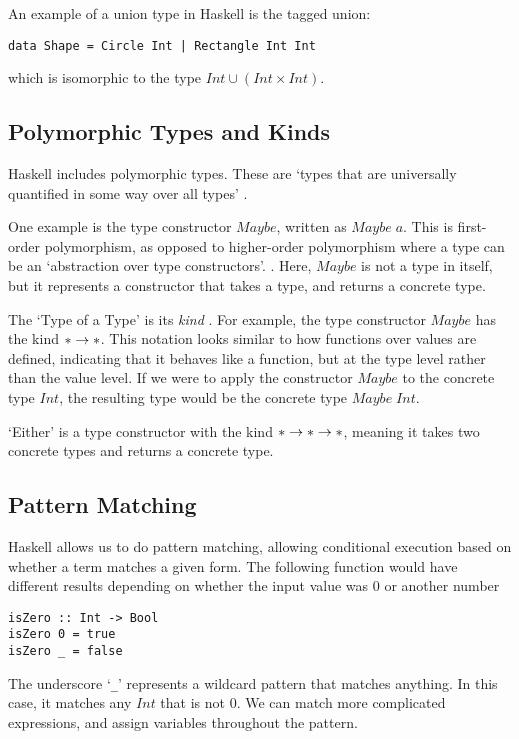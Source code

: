An example of a union type in Haskell is the tagged union:

\begin{verbatim}
data Shape = Circle Int | Rectangle Int Int
\end{verbatim}

\noindent which is isomorphic to the type \(Int \cup (Int \times Int)\). 

\subsection{Polymorphic Types and Kinds}
Haskell includes polymorphic types. These are `types that are universally quantified in some way over all types' \cite{hudak1992gentle}. 

One example is the type constructor $Maybe$, written as \(Maybe\;a\). This is first-order polymorphism, as opposed to higher-order polymorphism where a type can be an `abstraction over type constructors'. \cite{yallop2014lightweightpoly}. Here, \(Maybe\) is not a type in itself, but it represents a constructor that takes a type, and returns a concrete type. 

The `Type of a Type' is its \emph{kind} \cite{pierce2002types}. For example, the type constructor $Maybe$ has the kind $* \rightarrow *$. This notation looks similar to how functions over values are defined, indicating that it behaves like a function, but at the type level rather than the value level. If we were to apply the constructor \(Maybe\) to the concrete type \(Int\), the resulting type would be the concrete type \(Maybe \;Int\). 

`Either' is a type constructor with the kind $* \rightarrow * \rightarrow *$, meaning it takes two concrete types and returns a concrete type. 

\subsection{Pattern Matching}
Haskell allows us to do pattern matching, allowing conditional execution based on whether a term matches a given form. The following function would have different results depending on whether the input value was 0 or another number

\begin{verbatim}
isZero :: Int -> Bool
isZero 0 = true
isZero _ = false
\end{verbatim}

\noindent The underscore `\verb|_|' represents a wildcard pattern that matches anything. In this case, it matches any $Int$ that is not $0$. We can match more complicated expressions, and assign variables throughout the pattern.


